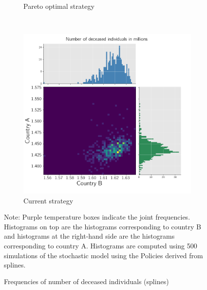 \begin{figure}[h!]
\begin{subfigure}[b]{0.49\textwidth}
         \caption{Pareto optimal strategy}
         \label{fig:2d_optimal}
     \end{subfigure}
     \\
     \begin{subfigure}[b]{0.49\textwidth}
         \centering
         \includegraphics[width=\textwidth]{images/splines_stochastic_histogram_deceased_current.png}
         \caption{Current strategy}
         \label{fig:2d_current}
     \end{subfigure}
\begin{flushleft}
\scriptsize{Note:} Purple temperature boxes indicate the joint frequencies. Histograms on top are the histograms corresponding to country B and histograms at the right-hand side are the histograms corresponding to country A. Histograms are computed using 500 simulations of the stochastic model using the Policies derived from splines. 
\end{flushleft}
        \caption{Frequencies of number of deceased individuals (splines)}
        \label{fig:histograms} 
\end{figure}

